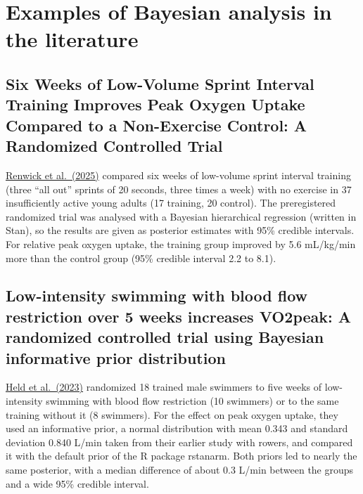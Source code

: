 \documentclass[
]{book}
\begin{document}
\section{Examples of Bayesian analysis in the literature}\label{bayes_literature_examples}

\subsection{Six Weeks of Low-Volume Sprint Interval Training Improves Peak Oxygen Uptake Compared to a Non-Exercise Control: A Randomized Controlled Trial}\label{six-weeks-of-low-volume-sprint-interval-training-improves-peak-oxygen-uptake-compared-to-a-non-exercise-control-a-randomized-controlled-trial}

\href{https://doi.org/10.1111/sms.70130}{Renwick et al.~(2025)} compared six weeks of low-volume sprint interval training (three ``all out'' sprints of 20 seconds, three times a week) with no exercise in 37 insufficiently active young adults (17 training, 20 control). The preregistered randomized trial was analysed with a Bayesian hierarchical regression (written in Stan), so the results are given as posterior estimates with 95\% credible intervals. For relative peak oxygen uptake, the training group improved by 5.6 mL/kg/min more than the control group (95\% credible interval 2.2 to 8.1).

\subsection{Low-intensity swimming with blood flow restriction over 5 weeks increases VO2peak: A randomized controlled trial using Bayesian informative prior distribution}\label{low-intensity-swimming-with-blood-flow-restriction-over-5-weeks-increases-vo2peak-a-randomized-controlled-trial-using-bayesian-informative-prior-distribution}

\href{https://doi.org/10.1080/17461391.2023.2180671}{Held et al.~(2023)} randomized 18 trained male swimmers to five weeks of low-intensity swimming with blood flow restriction (10 swimmers) or to the same training without it (8 swimmers). For the effect on peak oxygen uptake, they used an informative prior, a normal distribution with mean 0.343 and standard deviation 0.840 L/min taken from their earlier study with rowers, and compared it with the default prior of the R package rstanarm. Both priors led to nearly the same posterior, with a median difference of about 0.3 L/min between the groups and a wide 95\% credible interval.
\end{document}
